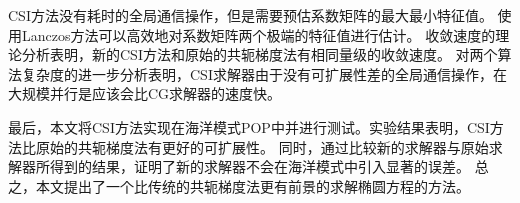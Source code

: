CSI方法没有耗时的全局通信操作，但是需要预估系数矩阵的最大最小特征值。
使用Lanczos方法可以高效地对系数矩阵两个极端的特征值进行估计。
收敛速度的理论分析表明，新的CSI方法和原始的共轭梯度法有相同量级的收敛速度。
对两个算法复杂度的进一步分析表明，CSI求解器由于没有可扩展性差的全局通信操作，在大规模并行是应该会比CG求解器的速度快。

最后，本文将CSI方法实现在海洋模式POP中并进行测试。实验结果表明，CSI方法比原始的共轭梯度法有更好的可扩展性。
同时，通过比较新的求解器与原始求解器所得到的结果，证明了新的求解器不会在海洋模式中引入显著的误差。
总之，本文提出了一个比传统的共轭梯度法更有前景的求解椭圆方程的方法。 

